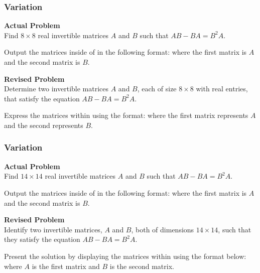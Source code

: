 \subsubsection{Variation}
\textbf{Actual Problem}\\
Find $8\times8$ real invertible matrices $A$ and $B$ such that $AB - BA = B^2A$.

Output the matrices inside of  in the following format:
where the first matrix is $A$ and the second matrix is $B$.


\textbf{Revised Problem}\\
Determine two invertible matrices $A$ and $B$, each of size $8 \times 8$ with real entries, that satisfy the equation $AB - BA = B^2A$.

Express the matrices within  using the format:
where the first matrix represents $A$ and the second represents $B$.

\subsubsection{Variation}
\textbf{Actual Problem}\\
Find $14\times14$ real invertible matrices $A$ and $B$ such that $AB - BA = B^2A$.

Output the matrices inside of  in the following format:
where the first matrix is $A$ and the second matrix is $B$.


\textbf{Revised Problem}\\
Identify two invertible matrices, \( A \) and \( B \), both of dimensions \( 14 \times 14 \), such that they satisfy the equation \( AB - BA = B^2A \).

Present the solution by displaying the matrices within  using the format below:
where \( A \) is the first matrix and \( B \) is the second matrix.

